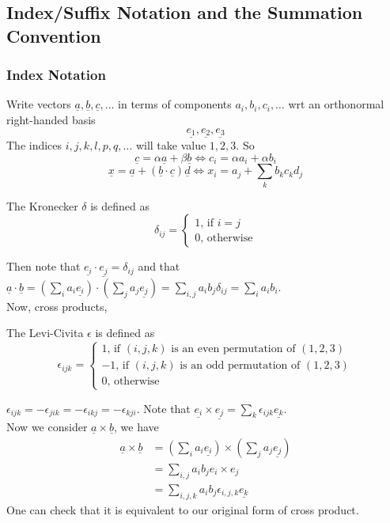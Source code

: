 \subsection{Index/Suffix Notation and the Summation Convention}
\subsubsection{Index Notation}
Write vectors $\underline{a},\underline{b},\underline{c},\ldots$ in terms of components $a_i,b_i,c_i,\ldots$ wrt an orthonormal right-handed basis
$$\underline{e_1},\underline{e_2},\underline{e_3}$$
The indices $i,j,k,l,p,q,\ldots$ will take value $1,2,3$.
So
$$\underline{c}=\alpha\underline{a}+\beta\underline{b}\iff c_i=\alpha a_i+\alpha b_i$$
$$\underline{x}=\underline{a}+(\underline{b}\cdot\underline{c})\underline{d}\iff x_i=a_j+\sum_kb_kc_kd_j$$
\begin{definition}
    The Kronecker $\delta$ is defined as
    $$\delta_{ij}=\begin{cases}
        1\text{, if $i=j$}\\
        0\text{, otherwise}
    \end{cases}$$
\end{definition}
Then note that $\underline{e_i}\cdot\underline{e_j}=\delta_{ij}$ and that $\underline{a}\cdot\underline{b}=(\sum_ia_i\underline{e_i})\cdot(\sum_ja_j\underline{e_j})=\sum_{i,j}a_ib_j\delta_{ij}=\sum_ia_ib_i$.\\
Now, cross products,
\begin{definition}
    The Levi-Civita $\epsilon$ is defined as
    $$\epsilon_{ijk}=
    \begin{cases}
        1\text{, if $(i,j,k)$ is an even permutation of $(1,2,3)$}\\
        -1\text{, if $(i,j,k)$ is an odd permutation of $(1,2,3)$}\\
        0\text{, otherwise}
    \end{cases}$$
\end{definition}
$\epsilon_{ijk}=-\epsilon_{jik}=-\epsilon_{ikj}=-\epsilon_{kji}$.
Note that $\underline{e_i}\times\underline{e_j}=\sum_k\epsilon_{ijk}\underline{e_k}$.\\
Now we consider $\underline{a}\times\underline{b}$, we have
\begin{align*}
    \underline{a}\times\underline{b}
    &=(\sum_ia_i\underline{e_i})\times(\sum_ja_j\underline{e_j})\\
    &=\sum_{i,j}a_ib_je_i\times e_j\\
    &=\sum_{i,j,k}a_ib_j\epsilon_{i,j,k}\underline{e_k}
\end{align*}
One can check that it is equivalent to our original form of cross product.

